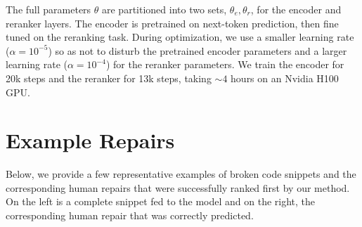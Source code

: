 \documentclass[sigplan,review,acmsmall,nonacm,screen,anonymous]{acmart}\settopmatter{printfolios=false,printccs=false,printacmref=false}
\begin{document}
The full parameters $\theta$ are partitioned into two sets, $\theta_e, \theta_r$, for the encoder and reranker layers. The encoder is pretrained on next-token prediction, then fine tuned on the reranking task. During optimization, we use a smaller learning rate ($\alpha = 10^{-5}$) so as not to disturb the pretrained encoder parameters and a larger learning rate ($\alpha = 10^{-4}$) for the reranker parameters. We train the encoder for 20k steps and the reranker for 13k steps, taking $\sim 4$ hours on an Nvidia H100 GPU.

\clearpage\section{Example Repairs}\label{sec:exaple_repairs}

Below, we provide a few representative examples of broken code snippets and the corresponding human repairs that were successfully ranked first by our method. On the left is a complete snippet fed to the model and on the right, the corresponding human repair that was correctly predicted.
\end{document}

